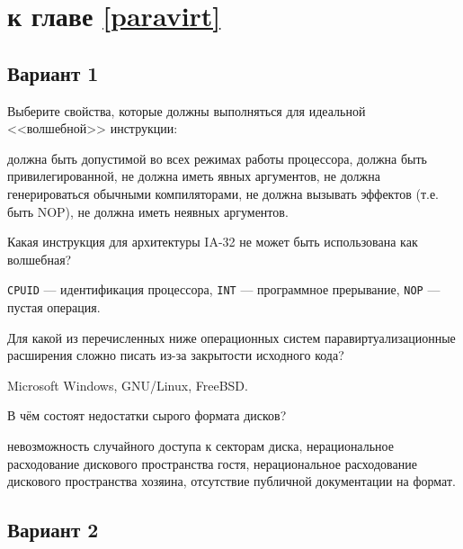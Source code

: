\section{\Questions к главе \ref{paravirt}} %

\subsection*{Вариант 1}

\begin{questions}

\question[3] Выберите свойства, которые должны выполняться для идеальной <<волшебной>> инструкции:
\begin{choices}
    \correctchoice должна быть допустимой во всех режимах работы процессора,
    \choice должна быть привилегированной,
    \choice не должна иметь явных аргументов,
    \correctchoice не должна генерироваться обычными компиляторами,
    \correctchoice не должна вызывать эффектов (т.е. быть NOP),
    \choice не должна иметь неявных аргументов.
\end{choices}

\question[3] Какая инструкция для архитектуры IA-32 не может быть использована как волшебная?
\begin{choices}
\choice \texttt{CPUID} --- идентификация процессора,
\correctchoice \texttt{INT} --- программное прерывание,
\choice \texttt{NOP} --- пустая операция.
\end{choices}

\question[3] Для какой из перечисленных ниже операционных систем паравиртуализационные расширения сложно писать из-за закрытости исходного кода?
\begin{choices}
\correctchoice Microsoft Windows,
\choice GNU/Linux,
\choice FreeBSD.
\end{choices}

\question[3] В чём состоят недостатки сырого формата дисков?
\begin{choices}
\choice невозможность случайного доступа к секторам диска,
\choice нерациональное расходование дискового пространства гостя,
\correctchoice нерациональное расходование дискового пространства хозяина,
\choice отсутствие публичной документации на формат.
\end{choices}

\end{questions}

\subsection*{Вариант 2}

